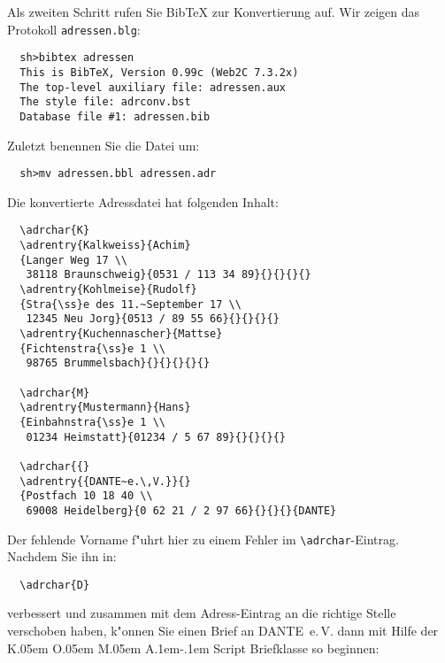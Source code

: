 \documentclass{article}
\newcommand*{\File}[1]{\texttt{#1}}
\newcommand*{\Macro}[1]{\texttt{\textbackslash #1}}
\DeclareRobustCommand{\KOMAScript}{\textsf{K\kern.05em O\kern.05em%
      M\kern.05em A\kern.1em-\kern.1em Script}}
\begin{document}
Als zweiten Schritt rufen Sie Bib\TeX{} zur 
Konvertierung auf. Wir 
zeigen das Protokoll \File{adressen.blg}: 

\begin{small}
\begin{verbatim}
  sh>bibtex adressen
  This is BibTeX, Version 0.99c (Web2C 7.3.2x)
  The top-level auxiliary file: adressen.aux
  The style file: adrconv.bst
  Database file #1: adressen.bib
\end{verbatim}
\end{small}

Zuletzt benennen Sie die Datei um:

\begin{small}
\begin{verbatim}
  sh>mv adressen.bbl adressen.adr
\end{verbatim}
\end{small}

Die konvertierte Adressdatei hat folgenden Inhalt:

\begin{small}
\begin{verbatim}
  \adrchar{K}
  \adrentry{Kalkweiss}{Achim}
  {Langer Weg 17 \\ 
   38118 Braunschweig}{0531 / 113 34 89}{}{}{}{}
  \adrentry{Kohlmeise}{Rudolf}
  {Stra{\ss}e des 11.~September 17 \\ 
   12345 Neu Jorg}{0513 / 89 55 66}{}{}{}{}
  \adrentry{Kuchennascher}{Mattse}
  {Fichtenstra{\ss}e 1 \\ 
   98765 Brummelsbach}{}{}{}{}{}

  \adrchar{M}
  \adrentry{Mustermann}{Hans}
  {Einbahnstra{\ss}e 1 \\ 
   01234 Heimstatt}{01234 / 5 67 89}{}{}{}{}

  \adrchar{{}
  \adrentry{{DANTE~e.\,V.}}{}
  {Postfach 10 18 40 \\ 
   69008 Heidelberg}{0 62 21 / 2 97 66}{}{}{}{DANTE}
\end{verbatim}
\end{small}

Der fehlende Vorname f"uhrt hier zu einem Fehler im 
\Macro{adrchar}-Eintrag. Nachdem Sie ihn in:

\begin{small}
\begin{verbatim}
  \adrchar{D}
\end{verbatim}
\end{small}

verbessert und zusammen mit dem Adress-Eintrag an die richtige Stelle
verschoben haben, k"onnen Sie einen Brief an DANTE~e.\,V. dann 
mit Hilfe der \KOMAScript{} Briefklasse so beginnen:
\end{document}

